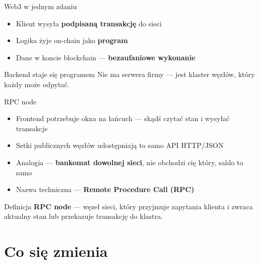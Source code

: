 \begin{frame}{Web3 w jednym zdaniu}
  \begin{itemize}
    \item Klient wysyła \textbf{podpisaną transakcję} do sieci
    \item Logika żyje on-chain jako \textbf{program}
    \item Dane w koncie blockchain --- \textbf{bezaufaniowe wykonanie}
  \end{itemize}
  \vspace{0.3cm}
  \begin{exampleblock}{Backend staje się programem}
    Nie ma serwera firmy --- jest klaster węzłów, który każdy może odpytać.
  \end{exampleblock}
\end{frame}

\begin{frame}{RPC node}
  \begin{itemize}
    \item Frontend potrzebuje okna na łańcuch --- skądś czytać stan i wysyłać transakcje
    \item Setki publicznych węzłów udostępniają to samo API HTTP/JSON
    \item Analogia --- \textbf{bankomat dowolnej sieci}, nie obchodzi cię który, saldo to samo
    \item Nazwa techniczna --- \textbf{Remote Procedure Call (RPC)}
  \end{itemize}
  \vspace{0.3cm}
  \begin{block}{Definicja}
    \textbf{RPC node} --- węzeł sieci, który przyjmuje zapytania klienta
    i zwraca aktualny stan lub przekazuje transakcję do klastra.
  \end{block}
\end{frame}

\section{Co się zmienia}


